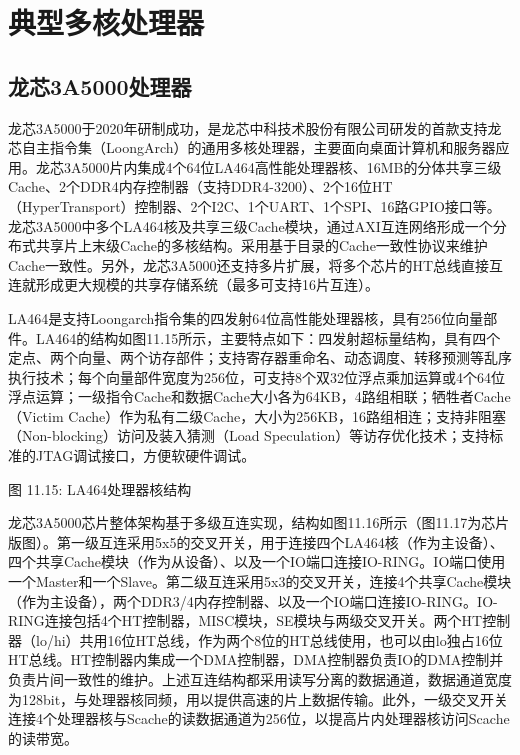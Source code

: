 \documentclass[]{ctexbook}
\begin{document}
\hypertarget{ux5178ux578bux591aux6838ux5904ux7406ux5668}{%
\section{典型多核处理器}\label{ux5178ux578bux591aux6838ux5904ux7406ux5668}}

\hypertarget{ux9f99ux82af3a5000ux5904ux7406ux5668}{%
\subsection{龙芯3A5000处理器}\label{ux9f99ux82af3a5000ux5904ux7406ux5668}}

龙芯3A5000于2020年研制成功，是龙芯中科技术股份有限公司研发的首款支持龙芯自主指令集（LoongArch）的通用多核处理器，主要面向桌面计算机和服务器应用。龙芯3A5000片内集成4个64位LA464高性能处理器核、16MB的分体共享三级Cache、2个DDR4内存控制器（支持DDR4-3200）、2个16位HT（HyperTransport）控制器、2个I2C、1个UART、1个SPI、16路GPIO接口等。龙芯3A5000中多个LA464核及共享三级Cache模块，通过AXI互连网络形成一个分布式共享片上末级Cache的多核结构。采用基于目录的Cache一致性协议来维护Cache一致性。另外，龙芯3A5000还支持多片扩展，将多个芯片的HT总线直接互连就形成更大规模的共享存储系统（最多可支持16片互连）。

LA464是支持Loongarch指令集的四发射64位高性能处理器核，具有256位向量部件。LA464的结构如图11.15所示，主要特点如下：四发射超标量结构，具有四个定点、两个向量、两个访存部件；支持寄存器重命名、动态调度、转移预测等乱序执行技术；每个向量部件宽度为256位，可支持8个双32位浮点乘加运算或4个64位浮点运算；一级指令Cache和数据Cache大小各为64KB，4路组相联；牺牲者Cache（Victim Cache）作为私有二级Cache，大小为256KB，16路组相连；支持非阻塞（Non-blocking）访问及装入猜测（Load Speculation）等访存优化技术；支持标准的JTAG调试接口，方便软硬件调试。

图 11.15: LA464处理器核结构

龙芯3A5000芯片整体架构基于多级互连实现，结构如图11.16所示（图11.17为芯片版图）。第一级互连采用5x5的交叉开关，用于连接四个LA464核（作为主设备）、四个共享Cache模块（作为从设备）、以及一个IO端口连接IO-RING。IO端口使用一个Master和一个Slave。第二级互连采用5x3的交叉开关，连接4个共享Cache模块（作为主设备），两个DDR3/4内存控制器、以及一个IO端口连接IO-RING。IO-RING连接包括4个HT控制器，MISC模块，SE模块与两级交叉开关。两个HT控制器（lo/hi）共用16位HT总线，作为两个8位的HT总线使用，也可以由lo独占16位HT总线。HT控制器内集成一个DMA控制器，DMA控制器负责IO的DMA控制并负责片间一致性的维护。上述互连结构都采用读写分离的数据通道，数据通道宽度为128bit，与处理器核同频，用以提供高速的片上数据传输。此外，一级交叉开关连接4个处理器核与Scache的读数据通道为256位，以提高片内处理器核访问Scache的读带宽。
\end{document}
